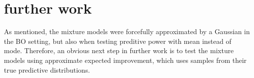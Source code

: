 







\section{further work}
As mentioned, the mixture models were forcefully approximated by a Gaussian in the BO setting, but also when testing preditive
power with mean instead of mode. Therefore, an obvious next step in further work is to test the mixture models using approximate
expected improvement, which uses samples from their true predictive distributions. 

